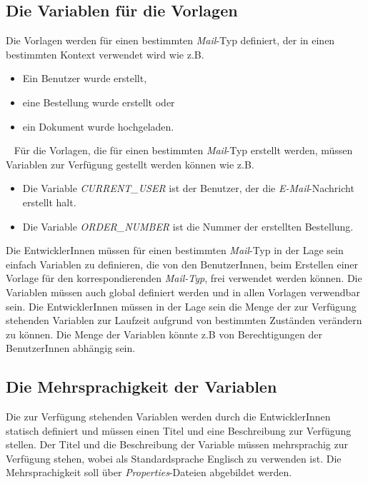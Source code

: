 \subsection{Die Variablen für die Vorlagen}
Die Vorlagen werden für einen bestimmten \emph{Mail}-Typ definiert, der in einen bestimmten Kontext verwendet wird wie z.B.
\begin{itemize}
	\item Ein Benutzer wurde erstellt,
	\item eine Bestellung wurde erstellt oder
	\item ein Dokument wurde hochgeladen.
\end{itemize}
\ \newline
Für die Vorlagen, die für einen bestimmten \emph{Mail}-Typ erstellt werden, müssen Variablen zur Verfügung gestellt werden können wie z.B.
\begin{itemize}
	\item Die Variable \emph{CURRENT\_USER}
	\newline
	ist der Benutzer, der die \emph{E-Mail}-Nachricht erstellt halt.
	\item Die Variable \emph{ORDER\_NUMBER}
	\newline
	ist die Nummer der erstellten Bestellung.
\end{itemize}
Die EntwicklerInnen müssen für einen bestimmten \emph{Mail}-Typ in der Lage sein einfach Variablen zu definieren, die von den BenutzerInnen, beim Erstellen einer Vorlage für den korrespondierenden \emph{Mail-Typ}, frei verwendet werden können. Die Variablen müssen auch global definiert werden und in allen Vorlagen verwendbar sein. Die EntwicklerInnen müssen in der Lage sein die Menge der zur Verfügung stehenden Variablen zur Laufzeit aufgrund von bestimmten Zuständen verändern zu können. Die Menge der Variablen könnte z.B von Berechtigungen der BenutzerInnen abhängig sein.

\subsection{Die Mehrsprachigkeit der Variablen}
Die zur Verfügung stehenden Variablen werden durch die EntwicklerInnen statisch definiert und müssen einen Titel und eine Beschreibung zur Verfügung stellen. Der Titel und die Beschreibung der Variable müssen mehrsprachig zur Verfügung stehen, wobei als Standardsprache Englisch zu verwenden ist. Die Mehrsprachigkeit soll über \emph{Properties}-Dateien abgebildet werden.

